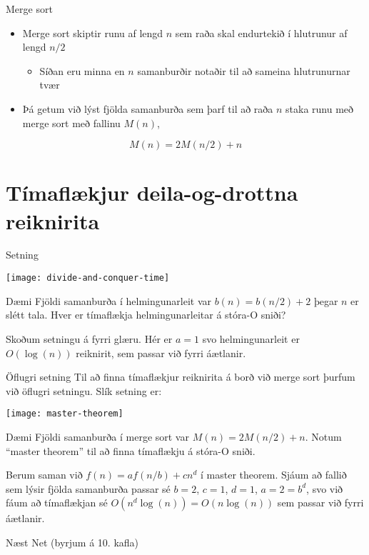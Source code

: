 \documentclass[handout]{beamer}
\begin{document}
\begin{frame}{Merge sort}
\begin{itemize}
 \item Merge sort skiptir runu af lengd $n$ sem raða skal endurtekið í hlutrunur af lengd $n/2$
 \begin{itemize}
  \item Síðan eru minna en $n$ samanburðir notaðir til að sameina hlutrunurnar tvær
 \end{itemize}
 \item Þá getum við lýst fjölda samanburða sem þarf til að raða $n$ staka runu með merge sort með fallinu $M(n)$,
\end{itemize}
\[
 M(n) = 2M(n/2) + n
\]
\end{frame}

\section{Tímaflækjur deila-og-drottna reiknirita}

\begin{frame}{Setning}
\begin{center}
\texttt{[image: divide-and-conquer-time]}
\end{center}
\end{frame}

\begin{frame}{Dæmi}
Fjöldi samanburða í helmingunarleit var $b(n) = b(n/2) + 2$ þegar $n$ er slétt tala. Hver er tímaflækja helmingunarleitar á stóra-O sniði? \pause

\vspace{1cm}
Skoðum setningu á fyrri glæru. Hér er $a=1$ svo helmingunarleit er $O(\log(n))$ reiknirit, sem passar við fyrri áætlanir.
\end{frame}

\begin{frame}{Öflugri setning}
Til að finna tímaflækjur reiknirita á borð við merge sort þurfum við öflugri setningu. Slík setning er:

\begin{center}
\texttt{[image: master-theorem]}
\end{center}
\end{frame}

\begin{frame}{Dæmi}
Fjöldi samanburða í merge sort var $M(n) = 2M(n/2) + n$. Notum ``master theorem'' til að finna tímaflækju á stóra-O sniði.

\vspace{1cm}
Berum saman við $f(n) = af(n/b) + cn^d$ í master theorem. Sjáum að fallið sem lýsir fjölda samanburða passar sé $b=2$, $c=1$, $d=1$, $a=2=b^d$, svo við fáum að tímaflækjan sé $O(n^d\log (n)) = O(n\log(n))$ sem passar við fyrri áætlanir.
\end{frame}

\begin{frame}{Næst}
Net (byrjum á 10. kafla)
\end{frame}
\end{document}
